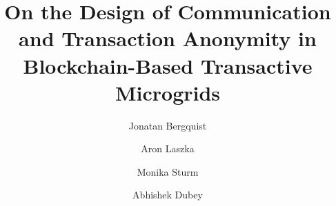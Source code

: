 \documentclass[sigplan]{acmart}
\newcommand{\Aron}[1]{\todo[color=green!40, linecolor=black!50]{\textbf{Aron}: #1}}
\begin{document}
\setlength{\marginparwidth}{1.5cm}


\title[Anonymity in Blockchain-Based Transactive Microgrids]{On the Design of Communication and Transaction Anonymity in Blockchain-Based Transactive Microgrids}

\author{Jonatan Bergquist}
\author{Aron Laszka}
\author{Monika Sturm}
\author{Abhishek Dubey}

\renewcommand{\shortauthors}{J. Bergquist et al.}


\end{document}
